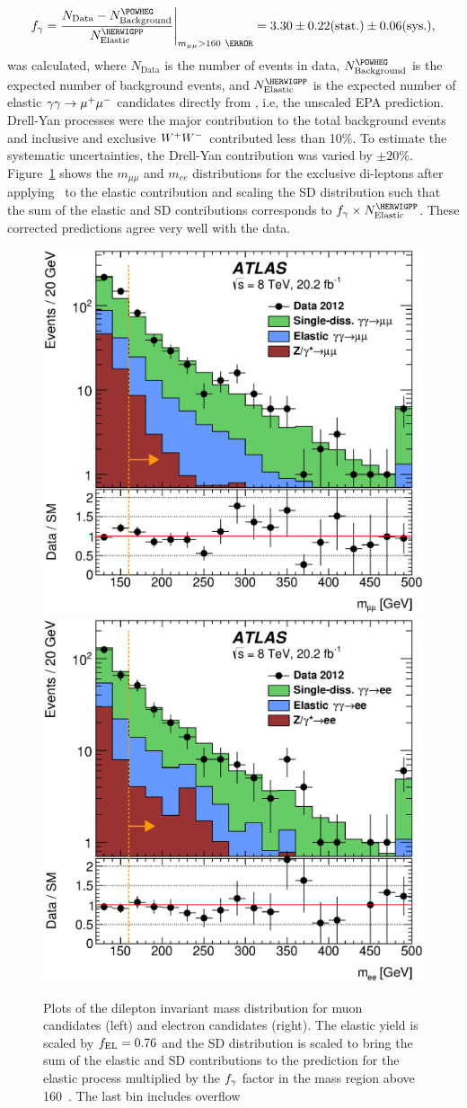 \begin{equation}
 \fgam = \frac{N_{\mathrm{Data}} 
              - N^{\POWHEG}_{\mathrm{Background}}}{N^{\HERWIGPP}_{\mathrm{Elastic}}} \Bigg\rvert_{m_{\mu\mu} > 160~\GeV}
            = 3.30 \pm 0.22 \mathrm{(stat.)} \pm 0.06 \mathrm{(sys.)},
 \label{eqn:fgamma}
\end{equation}
was calculated, where $N_{\mathrm{Data}}$ is the number of events in data, 
$N_{\mathrm{Background}}^{\POWHEG}$ is the expected number of
background events, 
and $N_{\mathrm{Elastic}}^{\HERWIGPP}$ is the expected number of elastic $\gamma\gamma \to \mu^+\mu^-$ candidates
directly from \HERWIGPP, i.e, the unscaled EPA prediction. 
Drell-Yan processes were the major contribution to the total background events and inclusive 
and exclusive $W^+W^-$ contributed less than 10\%. To estimate the systematic uncertainties, the Drell-Yan 
contribution was varied by $\pm20\%$. Figure~\ref{fig:fluxM160} shows the $m_{\mu\mu}$ and 
$m_{ee}$ distributions for the exclusive di-leptons after applying \fEL\ to the elastic contribution 
and scaling the SD distribution such that the sum of the elastic and SD contributions corresponds 
to $\fgam \times N_{\mathrm{Elastic}}^{\HERWIGPP}$. These corrected predictions agree very well with the data. 

\begin{figure}
 \includegraphics[width=0.5\linewidth]{figures/flux_m160mumu.eps} 
 \includegraphics[width=0.5\linewidth]{figures/flux_m160ee.eps} 
 \caption{Plots of the dilepton invariant mass distribution for muon
 candidates (left) and 
          electron candidates (right). The elastic yield is scaled 
          by $f_{\mathrm{EL}} = 0.76$ and the SD distribution is scaled to
          bring the sum of the elastic and SD contributions to the 
          \HERWIGPP prediction for the elastic process multiplied by
          the $f_{\gamma}$ factor in the mass region above
          160~\GeV. The last bin includes overflow}
 \label{fig:fluxM160}
\end{figure}

